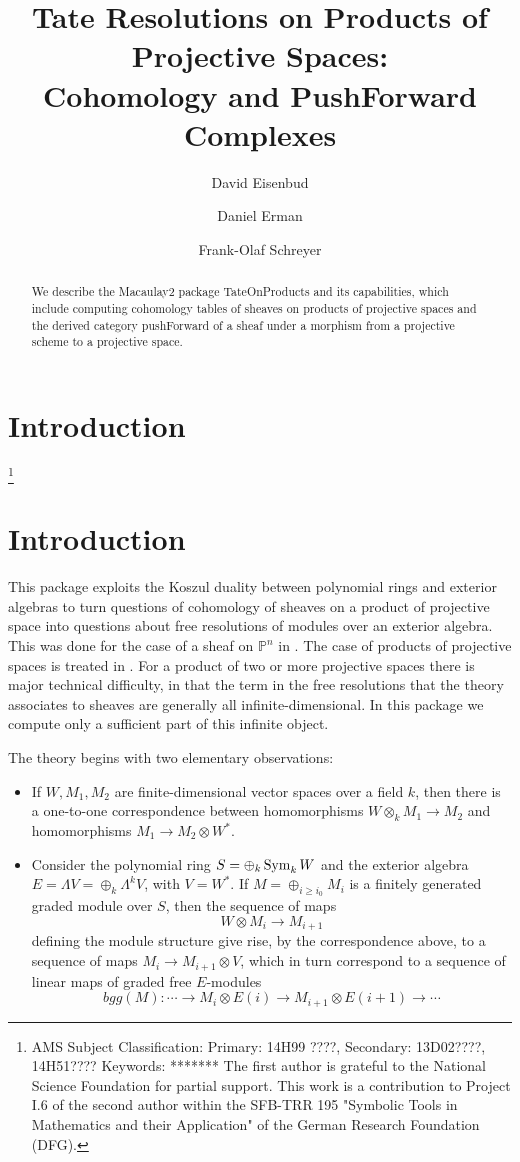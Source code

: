 \documentclass[twoside,12pt, leqno]{amsart}
\author[David Eisenbud]{David Eisenbud}
\author{Daniel Erman}
\author[Frank-Olaf Schreyer]{Frank-Olaf Schreyer}
\title{Tate Resolutions on Products of Projective Spaces: \\ Cohomology and PushForward Complexes}
\def\PP{{\mathbb P}}
\begin{document}
\begin{abstract}
We describe the  Macaulay2 package TateOnProducts and its capabilities, which include computing cohomology tables of sheaves
on products of projective spaces and the derived category pushForward of a sheaf under a morphism from a projective scheme to
a projective space.
\end{abstract}

\maketitle

\section*{Introduction} 
\let\thefootnote\relax\footnote{
\noindent AMS Subject Classification:
Primary: 14H99 ????,
Secondary: 13D02????, 14H51???? \smallbreak
Keywords: *******\smallbreak
The first author is grateful to the
National Science Foundation for partial support. This work is a contribution to Project I.6 of the second author within the SFB-TRR 195 "Symbolic Tools in Mathematics and their Application" of the German Research Foundation (DFG).}


\section*{Introduction}

This package exploits the Koszul duality between polynomial rings and exterior algebras to turn questions of cohomology of sheaves on a product of projective space into questions about free resolutions of modules over an exterior algebra. This was done for the case of a sheaf on $\PP^n$ in
\cite{EFS}. The case of products of projective spaces is treated in \cite{EES}. For a product of two or more projective
spaces there is major technical difficulty, in that the term in the free resolutions that the theory
associates to sheaves are generally all infinite-dimensional. In this package we compute only a sufficient
part of this infinite object.

The theory begins with two elementary observations:
\begin{itemize}
 \item If $W,M_1, M_2$ are finite-dimensional vector spaces over a field $k$, then there is a one-to-one correspondence between homomorphisms $W\otimes_kM_1\to M_2$ and homomorphisms
$ M_1 \to M_2 \otimes W^*$.
\item Consider the polynomial ring $S = \oplus_k \operatorname{Sym}_kW$ and the exterior algebra $E = \Lambda V= \oplus_k \Lambda^kV$, with $V=W^*$.
If $M = \oplus_{i\geq i_0} M_i$ is a finitely generated graded module over $S$, then the sequence of maps 
$$
W\otimes M_i \to M_{i+1}
$$
 defining the module structure give rise, by the correspondence above,
to a sequence of maps $M_i\to M_{i+1}\otimes V$, which in turn correspond to a sequence of
linear maps of graded free $E$-modules 
$$ 
bgg(M): \cdots \to M_i\otimes E(i) \to M_{i+1}\otimes E(i+1)\to \cdots
$$
\end{itemize}
\end{document}
